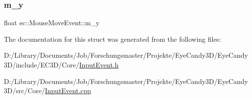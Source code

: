 \subsubsection{\texorpdfstring{m\+\_\+y}{m\_y}}
{\footnotesize\ttfamily float ec\+::\+Mouse\+Move\+Event\+::m\+\_\+y}



The documentation for this struct was generated from the following files\+:\begin{DoxyCompactItemize}
\item 
D\+:/\+Library/\+Documents/\+Job/\+Forschungsmaster/\+Projekte/\+Eye\+Candy3\+D/\+Eye\+Candy3\+D/include/\+E\+C3\+D/\+Core/\mbox{\hyperlink{_input_event_8h}{Input\+Event.\+h}}\item 
D\+:/\+Library/\+Documents/\+Job/\+Forschungsmaster/\+Projekte/\+Eye\+Candy3\+D/\+Eye\+Candy3\+D/src/\+Core/\mbox{\hyperlink{_input_event_8cpp}{Input\+Event.\+cpp}}\end{DoxyCompactItemize}
